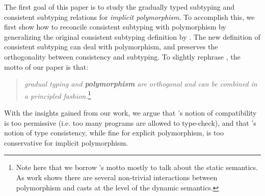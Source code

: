 The first goal of this paper is to study the gradually typed subtyping
and consistent subtyping relations for \emph{implicit polymorphism}. 
To accomplish this, we first show how
to reconcile consistent subtyping with polymorphism by generalizing
the original consistent subtyping definition by
\citeauthor{siek2007gradual}. The new definition of consistent
subtyping can deal with polymorphism, and preserves the orthogonality
between consistency and subtyping. To slightly rephrase \citeauthor{siek2007gradual},
the motto of our paper is that:

\begin{quote}\emph{gradual typing and {\bf polymorphism} are orthogonal and can be combined 
in a principled fashion.}\footnote{Note here that we borrow \citeauthor{siek2007gradual}'s motto
  mostly to talk about the static semantics. As \citet{ahmed2011blame}
work shows there are several non-trivial interactions between
polymorphism and casts at the level of the dynamic semantics.}
\end{quote}

\noindent With the insights gained from our work, we argue that
\citeauthor{ahmed2011blame}'s notion of compatibility is too permissive (i.e.
too many programs are allowed to type-check), and that
\citeauthor{yuu2017poly}'s notion of type consistency, while fine for explicit
polymorphism, is too conservative for implicit polymorphism.


